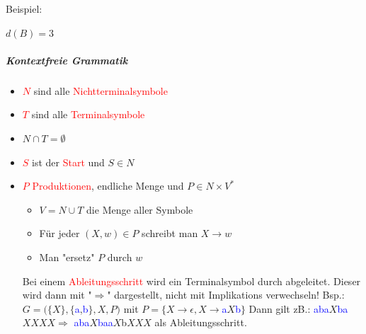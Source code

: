 \documentclass[12pt]{article}
\begin{document}
\begin{flushleft}
\begin{itemize}
    \end{itemize}
    \vspace{1cm}
    Beispiel: \linebreak
    \linebreak
     \linebreak \linebreak
    $d(B) = 3$
\end{flushleft}
\subparagraph{\large Kontextfreie Grammatik}
\normalsize
\begin{flushleft}
    \begin{itemize}
        \item \textcolor{red}{$N$} sind alle \textcolor{red}{Nichtterminalsymbole}
        \item \textcolor{red}{$T$} sind alle \textcolor{red}{Terminalsymbole}
        \item $N \cap T = \emptyset$
        \item \textcolor{red}{$S$} ist der \textcolor{red}{Start} und $S \in N$
        \item \textcolor{red}{$P$ Produktionen}, endliche Menge und $P \in N \times V^\ast$
        \begin{itemize}
            \item $V = N \cup T$ die Menge aller Symbole
            \item Für jeder $(X,w) \in P $ schreibt man $X \rightarrow w$
            \item Man "ersetz" $P$ durch $w$
        \end{itemize}
        Bei einem \textcolor{red}{Ableitungsschritt} wird ein Terminalsymbol durch abgeleitet. Dieser wird dann mit "$\Rightarrow$" dargestellt, nicht mit Implikations verwechseln!
        \linebreak \linebreak Bsp.: \linebreak
        $G = (\{X\},\{$\textcolor{blue}{a},\textcolor{blue}{b}$\},X,P)$ mit $ P = \{X \rightarrow \epsilon,X \rightarrow $\textcolor{blue}{a}$X$\textcolor{blue}{b}$\}$ \linebreak
        \linebreak
        Dann gilt zB.: \textcolor{blue}{aba}$X$\textcolor{blue}{ba}$XXXX \Rightarrow$  \textcolor{blue}{aba}$X$\textcolor{blue}{baa}$X$b$XXX$ als Ableitungsschritt.

\end{itemize}
\end{flushleft}
\end{document}
